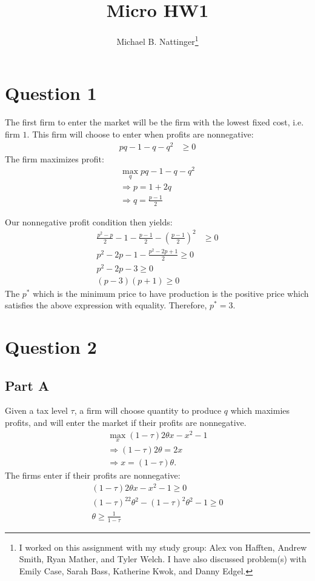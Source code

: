 \documentclass[11pt]{article} %
\title{Micro HW1}
\author{Michael B. Nattinger\footnote{I worked on this assignment with my study group: Alex von Hafften, Andrew Smith, Ryan Mather, and Tyler Welch. I have also discussed problem(s) with Emily Case, Sarah Bass, Katherine Kwok, and Danny Edgel.}}
\begin{document}
\maketitle

\section{Question 1}
The first firm to enter the market will be the firm with the lowest fixed cost, i.e. firm $1$. This firm will choose to enter when profits are nonnegative:
\begin{align*}
pq - 1 - q - q^2 &\geq 0
\end{align*}
The firm maximizes profit:
\begin{align*}
\max_{q} pq - 1 - q - q^2\\
\Rightarrow p = 1+2q\\
\Rightarrow q = \frac{p-1}{2}
\end{align*}

Our nonnegative profit condition then yields:
\begin{align*}
\frac{p^2-p}{2} - 1 -  \frac{p-1}{2} - \left(  \frac{p-1}{2} \right)^2 &\geq 0\\
p^2 - 2p - 1 - \frac{p^2 - 2p +1}{2} \geq 0\\
p^2 - 2p -3 \geq 0\\
(p-3)(p+1) \geq 0
\end{align*}
The $p^*$ which is the minimum price to have production is the positive price which satisfies the above expression with equality. Therefore, $p^* = 3$.

\section{Question 2}
\subsection{Part A}
Given a tax level $\tau$, a firm will choose quantity to produce $q$ which maximies profits, and will enter the market if their profits are nonnegative.
\begin{align*}
\max_{x} (1-\tau)2\theta x- x^2 -1\\
\Rightarrow (1-\tau)2\theta = 2x\\
\Rightarrow x = (1-\tau)\theta.
\end{align*}
The firms enter if their profits are nonnegative:
\begin{align*}
(1-\tau)2\theta x- x^2 -1 \geq 0\\ 
(1-\tau)^22\theta^2 - (1-\tau)^2\theta^2 -1 \geq 0\\ 
\theta \geq \frac{1}{1-\tau}
\end{align*}
\end{document}
